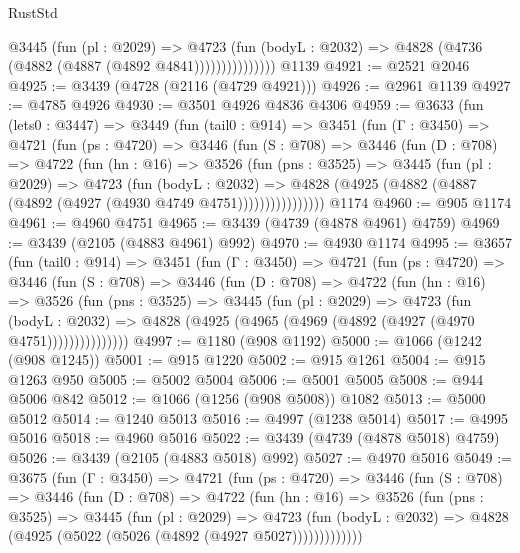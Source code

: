 \begin{lexlean}{RustStd}
\begin{coremodule}
                    @3445
                      (fun (pl : @2029) =>
                      @4723
                        (fun (bodyL : @2032) =>
                        @4828 (@4736 (@4882 (@4887 (@4892 @4841)))))))))))))))
    @1139
@4921 := @2521 @2046
@4925 := @3439 (@4728 (@2116 (@4729 @4921)))
@4926 := @2961 @1139
@4927 := @4785 @4926
@4930 := @3501 @4926 @4836 @4306
@4959 := @3633
    (fun (lets0 : @3447) =>
    @3449
      (fun (tail0 : @914) =>
      @3451
        (fun (Γ : @3450) =>
        @4721
          (fun (ps : @4720) =>
          @3446
            (fun (S : @708) =>
            @3446
              (fun (D : @708) =>
              @4722
                (fun (hn : @16) =>
                @3526
                  (fun (pns : @3525) =>
                  @3445
                    (fun (pl : @2029) =>
                    @4723
                      (fun (bodyL : @2032) =>
                      @4828 (@4925 (@4882 (@4887 (@4892 (@4927 (@4930 @4749 @4751))))))))))))))))
    @1174
@4960 := @905 @1174
@4961 := @4960 @4751
@4965 := @3439 (@4739 (@4878 @4961) @4759)
@4969 := @3439 (@2105 (@4883 @4961) @992)
@4970 := @4930 @1174
@4995 := @3657
    (fun (tail0 : @914) =>
    @3451
      (fun (Γ : @3450) =>
      @4721
        (fun (ps : @4720) =>
        @3446
          (fun (S : @708) =>
          @3446
            (fun (D : @708) =>
            @4722
              (fun (hn : @16) =>
              @3526
                (fun (pns : @3525) =>
                @3445
                  (fun (pl : @2029) =>
                  @4723
                    (fun (bodyL : @2032) =>
                    @4828 (@4925 (@4965 (@4969 (@4892 (@4927 (@4970 @4751)))))))))))))))
@4997 := @1180 (@908 @1192)
@5000 := @1066 (@1242 (@908 @1245))
@5001 := @915 @1220
@5002 := @915 @1261
@5004 := @915 @1263 @950
@5005 := @5002 @5004
@5006 := @5001 @5005
@5008 := @944 @5006 @842
@5012 := @1066 (@1256 (@908 @5008)) @1082
@5013 := @5000 @5012
@5014 := @1240 @5013
@5016 := @4997 (@1238 @5014)
@5017 := @4995 @5016
@5018 := @4960 @5016
@5022 := @3439 (@4739 (@4878 @5018) @4759)
@5026 := @3439 (@2105 (@4883 @5018) @992)
@5027 := @4970 @5016
@5049 := @3675
    (fun (Γ : @3450) =>
    @4721
      (fun (ps : @4720) =>
      @3446
        (fun (S : @708) =>
        @3446
          (fun (D : @708) =>
          @4722
            (fun (hn : @16) =>
            @3526
              (fun (pns : @3525) =>
              @3445
                (fun (pl : @2029) =>
                @4723
                  (fun (bodyL : @2032) =>
                  @4828 (@4925 (@5022 (@5026 (@4892 (@4927 @5027)))))))))))))

\end{coremodule}
\end{lexlean}
